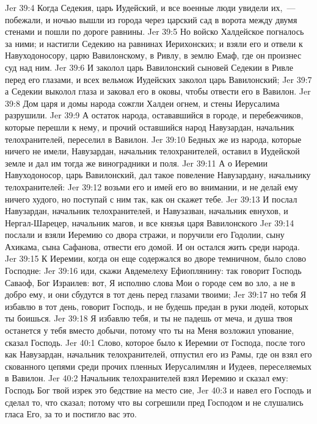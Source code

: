 \vs Jer 39:4 Когда Седекия, царь Иудейский, и все военные люди увидели их,~--- побежали, и ночью вышли из города через царский сад в ворота между двумя стенами и пошли по дороге равнины.
\vs Jer 39:5 Но войско Халдейское погналось за ними; и настигли Седекию на равнинах Иерихонских; и взяли его и отвели к Навуходоносору, царю Вавилонскому, в Ривлу, в землю Емаф, где он произнес суд над ним.
\vs Jer 39:6 И заколол царь Вавилонский сыновей Седекии в Ривле перед его глазами, и всех вельмож Иудейских заколол царь Вавилонский;
\vs Jer 39:7 а Седекии выколол глаза и заковал его в оковы, чтобы отвести его в Вавилон.
\vs Jer 39:8 Дом царя и домы народа сожгли Халдеи огнем, и стены Иерусалима разрушили.
\vs Jer 39:9 А остаток народа, остававшийся в городе, и перебежчиков, которые перешли к нему, и прочий оставшийся народ Навузардан, начальник телохранителей, переселил в Вавилон.
\vs Jer 39:10 Бедных же из народа, которые ничего не имели, Навузардан, начальник телохранителей, оставил в Иудейской земле и дал им тогда же виноградники и поля.
\vs Jer 39:11 А о Иеремии Навуходоносор, царь Вавилонский, дал такое повеление Навузардану, начальнику телохранителей:
\vs Jer 39:12 возьми его и имей его во внимании, и не делай ему ничего худого, но поступай с ним так, как он скажет тебе.
\vs Jer 39:13 И послал Навузардан, начальник телохранителей, и Навузазван, начальник евнухов, и Нергал-Шарецер, начальник магов, и все князья царя Вавилонского
\vs Jer 39:14 послали и взяли Иеремию со двора стражи, и поручили его Годолии, сыну Ахикама, сына Сафанова, отвести его домой. И он остался жить среди народа.
\rsbpar\vs Jer 39:15 К Иеремии, когда он еще содержался во дворе темничном, было слово Господне:
\vs Jer 39:16 иди, скажи Авдемелеху Ефиоплянину: так говорит Господь Саваоф, Бог Израилев: вот, Я исполню слова Мои о городе сем во зло, а не в добро ему, и они сбудутся в тот день перед глазами твоими;
\vs Jer 39:17 но тебя Я избавлю в тот день, говорит Господь, и не будешь предан в руки людей, которых ты боишься.
\vs Jer 39:18 Я избавлю тебя, и ты не падешь от меча, и душа твоя останется у тебя вместо добычи, потому что ты на Меня возложил упование, сказал Господь.
\vs Jer 40:1 Слово, которое было к Иеремии от Господа, после того как Навузардан, начальник телохранителей, отпустил его из Рамы, где он взял его скованного цепями среди прочих пленных Иерусалимлян и Иудеев, переселяемых в Вавилон.
\vs Jer 40:2 Начальник телохранителей взял Иеремию и сказал ему: Господь Бог твой изрек это бедствие на место сие,
\vs Jer 40:3 и навел его Господь и сделал то, что сказал; потому что вы согрешили пред Господом и не слушались гласа Его, за то и постигло вас это.
